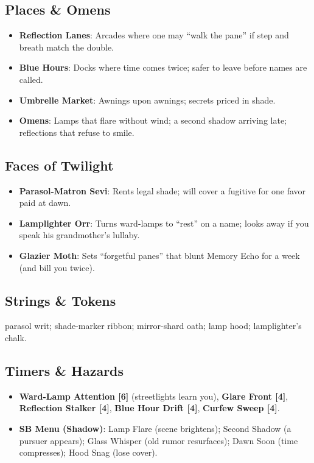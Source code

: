 \documentclass[11pt]{book}
\begin{document}
\subsection*{Places \& Omens}
\begin{itemize}
    \item \textbf{Reflection Lanes}: Arcades where one may ``walk the pane'' if step and breath match the double.
    \item \textbf{Blue Hours}: Docks where time comes twice; safer to leave before names are called.
    \item \textbf{Umbrelle Market}: Awnings upon awnings; secrets priced in shade.
    \item \textbf{Omens}: Lamps that flare without wind; a second shadow arriving late; reflections that refuse to smile.
\end{itemize}

\subsection*{Faces of Twilight}
\begin{itemize}
    \item \textbf{Parasol-Matron Sevi}: Rents legal shade; will cover a fugitive for one favor paid at dawn.
    \item \textbf{Lamplighter Orr}: Turns ward-lamps to ``rest'' on a name; looks away if you speak his grandmother's lullaby.
    \item \textbf{Glazier Moth}: Sets ``forgetful panes'' that blunt Memory Echo for a week (and bill you twice).
\end{itemize}

\subsection*{Strings \& Tokens}
parasol writ; shade-marker ribbon; mirror-shard oath; lamp hood; lamplighter's chalk.

\subsection*{Timers \& Hazards}
\begin{itemize}
    \item \textbf{Ward-Lamp Attention [6]} (streetlights learn you), \textbf{Glare Front [4]}, \textbf{Reflection Stalker [4]}, \textbf{Blue Hour Drift [4]}, \textbf{Curfew Sweep [4]}.
    \item \textbf{SB Menu (Shadow)}: Lamp Flare (scene brightens); Second Shadow (a pursuer appears); Glass Whisper (old rumor resurfaces); Dawn Soon (time compresses); Hood Snag (lose cover).
\end{itemize}
\end{document}
